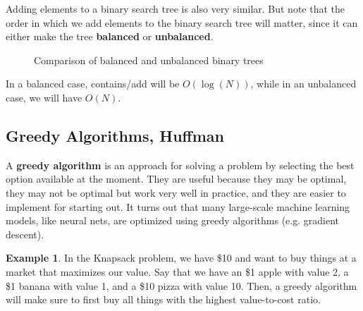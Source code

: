 \documentclass{article}
\theoremstyle{definition}
\newtheorem{example}{Example}[section]
\theoremstyle{remark}
\theoremstyle{definition}
\begin{document}
Adding elements to a binary search tree is also very similar. But note that the order in which we add elements to the binary search tree will matter, since it can either make the tree \textbf{balanced} or \textbf{unbalanced}. 
\begin{figure}[h]
\centering
{}
\caption{Comparison of balanced and unbalanced binary trees}
\label{fig:trees}
\end{figure}
In a balanced case, contains/add will be $O(\log(N))$, while in an unbalanced case, we will have $O(N)$. 


\subsection{Greedy Algorithms, Huffman}

A \textbf{greedy algorithm} is an approach for solving a problem by selecting the best option available at the moment. They are useful because they may be optimal, they may not be optimal but work very well in practice, and they are easier to implement for starting out. It turns out that many large-scale machine learning models, like neural nets, are optimized using greedy algorithms (e.g. gradient descent). 

\begin{example}
In the Knapsack problem, we have \$10 and want to buy things at a market that maximizes our value. Say that we have an \$1 apple with value 2, a \$1 banana with value 1, and a \$10 pizza with value 10. Then, a greedy algorithm will make sure to first buy all things with the highest value-to-cost ratio. 
\end{example}
\end{document}
